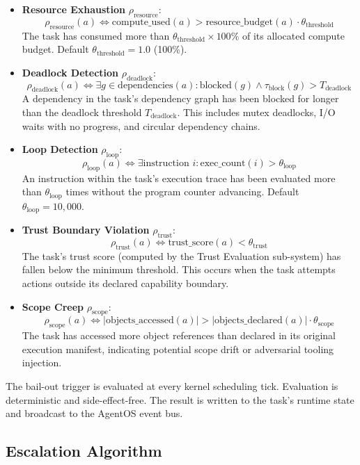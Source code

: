 \begin{itemize}
\item \textbf{Resource Exhaustion} $\rho_\text{resource}$:
\[
\rho_\text{resource}(a) \iff \text{compute\_used}(a) > \text{resource\_budget}(a) \cdot \theta_\text{threshold}
\]
The task has consumed more than $\theta_\text{threshold} \times 100\%$ of its allocated compute budget. Default $\theta_\text{threshold} = 1.0$ (100\%).

\item \textbf{Deadlock Detection} $\rho_\text{deadlock}$:
\[
\rho_\text{deadlock}(a) \iff \exists g \in \text{dependencies}(a) : \text{blocked}(g) \land \tau_\text{block}(g) > T_\text{deadlock}
\]
A dependency in the task's dependency graph has been blocked for longer than the deadlock threshold $T_\text{deadlock}$. This includes mutex deadlocks, I/O waits with no progress, and circular dependency chains.

\item \textbf{Loop Detection} $\rho_\text{loop}$:
\[
\rho_\text{loop}(a) \iff \exists \text{instruction } i : \text{exec\_count}(i) > \theta_\text{loop}
\]
An instruction within the task's execution trace has been evaluated more than $\theta_\text{loop}$ times without the program counter advancing. Default $\theta_\text{loop} = 10{,}000$.

\item \textbf{Trust Boundary Violation} $\rho_\text{trust}$:
\[
\rho_\text{trust}(a) \iff \text{trust\_score}(a) < \theta_\text{trust}
\]
The task's trust score (computed by the Trust Evaluation sub-system) has fallen below the minimum threshold. This occurs when the task attempts actions outside its declared capability boundary.

\item \textbf{Scope Creep} $\rho_\text{scope}$:
\[
\rho_\text{scope}(a) \iff |\text{objects\_accessed}(a)| > |\text{objects\_declared}(a)| \cdot \theta_\text{scope}
\]
The task has accessed more object references than declared in its original execution manifest, indicating potential scope drift or adversarial tooling injection.
\end{itemize}

The bail-out trigger is evaluated at every kernel scheduling tick. Evaluation is deterministic and side-effect-free. The result is written to the task's runtime state and broadcast to the AgentOS event bus.

\subsection{Escalation Algorithm}

